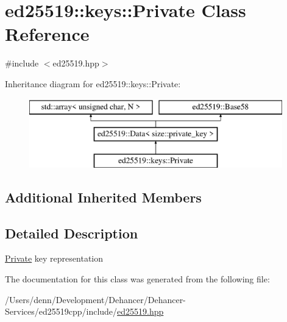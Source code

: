 \hypertarget{classed25519_1_1keys_1_1_private}{}\section{ed25519\+:\+:keys\+:\+:Private Class Reference}
\label{classed25519_1_1keys_1_1_private}


{\ttfamily \#include $<$ed25519.\+hpp$>$}

Inheritance diagram for ed25519\+:\+:keys\+:\+:Private\+:\begin{figure}[H]
\begin{center}
\leavevmode
\includegraphics[height=3.000000cm]{classed25519_1_1keys_1_1_private}
\end{center}
\end{figure}
\subsection*{Additional Inherited Members}


\subsection{Detailed Description}
\mbox{\hyperlink{classed25519_1_1keys_1_1_private}{Private}} key representation 

The documentation for this class was generated from the following file\+:\begin{DoxyCompactItemize}
\item 
/\+Users/denn/\+Development/\+Dehancer/\+Dehancer-\/\+Services/ed25519cpp/include/\mbox{\hyperlink{ed25519_8hpp}{ed25519.\+hpp}}\end{DoxyCompactItemize}
